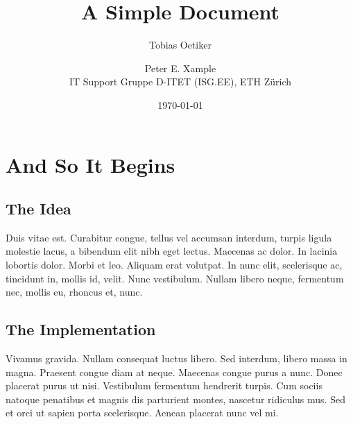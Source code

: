 \documentclass[a4paper,12pt]{book}
\title{A Simple Document}
\date{\today}
\author{Tobias Oetiker\and Peter E. Xample\\
IT Support Gruppe D-ITET (ISG.EE), ETH Z\"urich}
\begin{document}
\maketitle

\tableofcontents

\mainmatter

\chapter{And So It Begins}


\section{The Idea}
Duis vitae est. Curabitur congue, tellus vel accumsan interdum, turpis
ligula molestie lacus, a bibendum elit nibh eget lectus. Maecenas ac
dolor. In lacinia lobortis dolor. Morbi et leo. Aliquam erat
volutpat. In nunc elit, scelerisque ac, tincidunt in, mollis id,
velit. Nunc vestibulum. Nullam libero neque, fermentum nec, mollis eu,
rhoncus et, nunc. 

\section{The Implementation}


Vivamus gravida. Nullam consequat luctus libero. Sed interdum, libero
massa in magna. Praesent congue diam at neque. Maecenas congue purus a
nunc. Donec placerat purus ut nisi. Vestibulum fermentum hendrerit
turpis. Cum sociis natoque penatibus et magnis dis parturient montes,
nascetur ridiculus mus. Sed et orci ut sapien porta
scelerisque. Aenean placerat nunc vel mi. 
\end{document}
